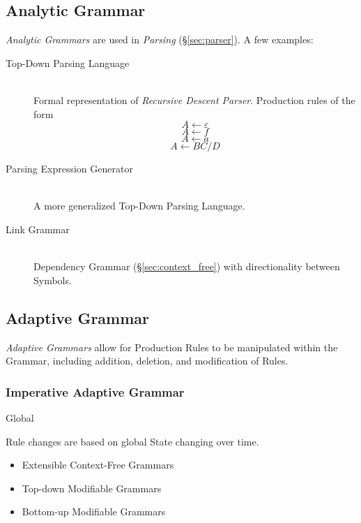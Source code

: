 \subsection{Analytic Grammar}\label{sec:analytic_grammar}

\emph{Analytic Grammars} are used in \emph{Parsing}
(\S\ref{sec:parser}). A few examples:

\begin{description}
\item[Top-Down Parsing Language] \hfill \\
Formal representation of \emph{Recursive Descent Parser}. Production
rules of the form
\[
    A \leftarrow \varepsilon
\]\[
    A \leftarrow f
\]\[
    A \leftarrow a
\]\[
    A \leftarrow BC/D
\]
\item[Parsing Expression Generator] \hfill \\
A more generalized Top-Down Parsing Language.
\item[Link Grammar] \hfill \\
Dependency Grammar
  (\S\ref{sec:context_free}) with directionality between Symbols.
\end{description}



\subsection{Adaptive Grammar}\label{sec:adaptive_grammar}

\emph{Adaptive Grammars} allow for Production Rules to be manipulated
within the Grammar, including addition, deletion, and modification of
Rules.



\subsubsection{Imperative Adaptive Grammar}

Global

Rule changes are based on global State changing over time.

\begin{itemize}
\item Extensible Context-Free Grammars
\item Top-down Modifiable Grammars
\item Bottom-up Modifiable Grammars
\end{itemize}



